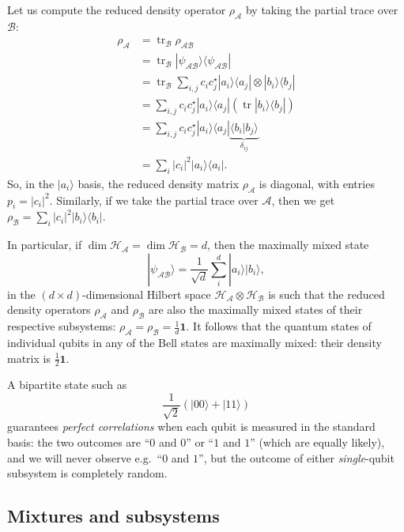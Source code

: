 \documentclass[fleqn,a4paper]{article}
\theoremstyle{definition}
\theoremstyle{definition}
\theoremstyle{definition}
\theoremstyle{definition}
\theoremstyle{remark}
\begin{document}
Let us compute the reduced density operator \(\rho_{\mathcal{A}}\) by taking the partial trace over \(\mathcal{B}\):
\[
  \begin{aligned}
    \rho_{\mathcal{A}}
    &= \operatorname{tr}_{\mathcal{B}}\rho_{\mathcal{AB}}
  \\&= \operatorname{tr}_{\mathcal{B}} |\psi_{\mathcal{AB}}\rangle\langle\psi_{\mathcal{AB}}|
  \\&= \operatorname{tr}_{\mathcal{B}} \sum_{i,j} c_i c^\star_j |a_i\rangle\langle a_j| \otimes |b_i\rangle\langle b_j|
  \\&= \sum_{i,j} c_i c^\star_j |a_i\rangle\langle a_j|(\operatorname{tr}|b_i\rangle\langle b_j|)
  \\&= \sum_{i,j} c_i c^\star_j |a_i\rangle\langle a_j| \underbrace{\langle b_i|b_j\rangle}_{\delta_{ij}}
  \\& = \sum_{i} |c_i|^2 |a_i\rangle\langle a_i|.
  \end{aligned}
\]
So, in the \(|a_i\rangle\) basis, the reduced density matrix \(\rho_{\mathcal{A}}\) is diagonal, with entries \(p_i=|c_i|^2\).
Similarly, if we take the partial trace over \(\mathcal{A}\), then we get \(\rho_{\mathcal{B}}=\sum_{i} |c_i|^2 |b_i\rangle\langle b_i|\).

In particular, if \(\dim\mathcal{H}_{\mathcal{A}}=\dim\mathcal{H}_{\mathcal{B}}=d\), then the maximally mixed state
\[
  |\psi_{\mathcal{AB}}\rangle
  = \frac{1}{\sqrt{d}} \sum_{i}^d |a_i\rangle|b_i\rangle,
\]
in the \((d\times d)\)-dimensional Hilbert space \(\mathcal{H}_{\mathcal{A}}\otimes\mathcal{H}_{\mathcal{B}}\) is such that the reduced density operators \(\rho_{\mathcal{A}}\) and \(\rho_{\mathcal{B}}\) are also the maximally mixed states of their respective subsystems: \(\rho_{\mathcal{A}}=\rho_{\mathcal{B}}=\frac{1}{d}\mathbf{1}\).
It follows that the quantum states of individual qubits in any of the Bell states are maximally mixed: their density matrix is \(\frac{1}{2}\mathbf{1}\).

A bipartite state such as
\[
  \frac{1}{\sqrt{2}} \left( |00\rangle + |11\rangle \right)
\]
guarantees \emph{perfect correlations} when each qubit is measured in the standard basis: the two outcomes are ``\(0\) and \(0\)'' or ``\(1\) and \(1\)'' (which are equally likely), and we will never observe e.g.~``\(0\) and \(1\)'', but the outcome of either \emph{single}-qubit subsystem is completely random.

\hypertarget{mixtures-and-subsystems}{%
\subsection{Mixtures and subsystems}\label{mixtures-and-subsystems}}
\end{document}
